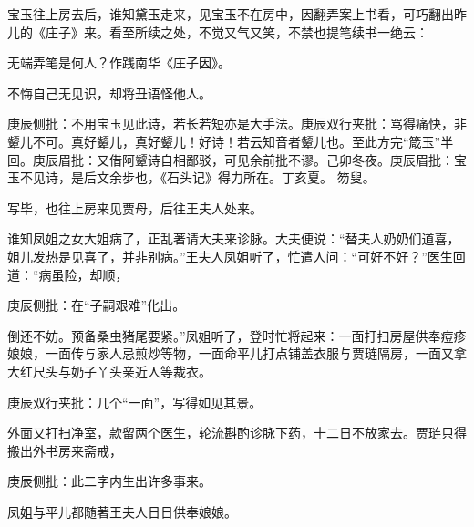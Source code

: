 \begin{parag}

    宝玉往上房去后，谁知黛玉走来，见宝玉不在房中，因翻弄案上书看，可巧翻出昨儿的《庄子》来。看至所续之处，不觉又气又笑，不禁也提笔续书一绝云：
\end{parag}
\begin{poem}
    \begin{pl}无端弄笔是何人？作践南华《庄子因》。\end{pl}

    \begin{pl}不悔自己无见识，却将丑语怪他人。\end{pl}
    \begin{note}庚辰侧批：不用宝玉见此诗，若长若短亦是大手法。庚辰双行夹批：骂得痛快，非颦儿不可。真好颦儿，真好颦儿！好诗！若云知音者颦儿也。至此方完“箴玉”半回。庚辰眉批：又借阿颦诗自相鄙驳，可见余前批不谬。己卯冬夜。庚辰眉批：宝玉不见诗，是后文余步也，《石头记》得力所在。丁亥夏。 笏叟。\end{note}
\end{poem}
\begin{parag}

    写毕，也往上房来见贾母，后往王夫人处来。
\end{parag}


\begin{parag}


    谁知凤姐之女大姐病了，正乱著请大夫来诊脉。大夫便说：“替夫人奶奶们道喜，姐儿发热是见喜了，并非别病。”王夫人凤姐听了，忙遣人问：“可好不好？”医生回道：“病虽险，却顺，\begin{note}庚辰侧批：在“子嗣艰难”化出。\end{note}倒还不妨。预备桑虫猪尾要紧。”凤姐听了，登时忙将起来：一面打扫房屋供奉痘疹娘娘，一面传与家人忌煎炒等物，一面命平儿打点铺盖衣服与贾琏隔房，一面又拿大红尺头与奶子丫头亲近人等裁衣。\begin{note}庚辰双行夹批：几个“一面”，写得如见其景。\end{note}外面又打扫净室，款留两个医生，轮流斟酌诊脉下药，十二日不放家去。贾琏只得搬出外书房来斋戒，\begin{note}庚辰侧批：此二字内生出许多事来。\end{note}凤姐与平儿都随著王夫人日日供奉娘娘。
\end{parag}


